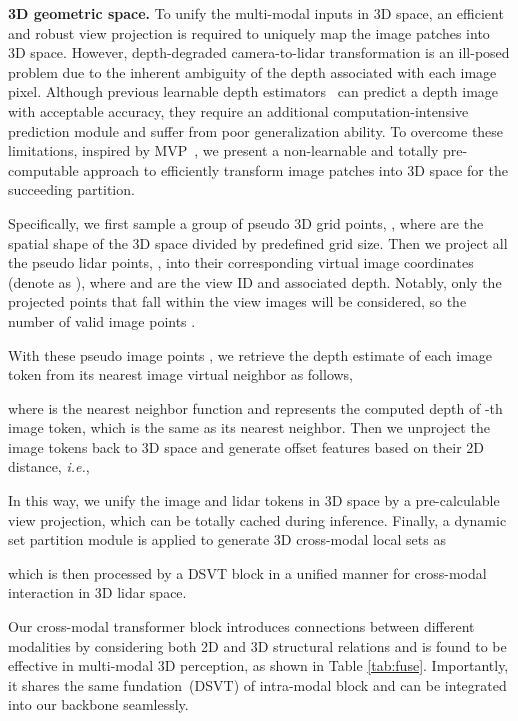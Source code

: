 \documentclass[10pt,twocolumn,letterpaper]{article}
\begin{document}
\noindent \textbf{3D geometric space.} To unify the multi-modal inputs in 3D space, an efficient and robust view projection is required to uniquely map the image patches into 3D space. However, depth-degraded camera-to-lidar transformation is an ill-posed problem due to the inherent ambiguity of the depth associated with each image pixel. Although previous learnable depth estimators~\cite{godard2017unsupervised,fu2018deep} can predict a depth image with acceptable accuracy, they require an additional computation-intensive prediction module and suffer from poor generalization ability. To overcome these limitations, inspired by MVP~\cite{yin2021multimodal}, we present a non-learnable and totally pre-computable approach to efficiently transform image patches into 3D space for the succeeding partition. 

Specifically, we first sample a group of pseudo 3D grid points, , where  are the spatial shape of the 3D space divided by predefined grid size. Then we project all the pseudo lidar points, , into their corresponding virtual image coordinates (denote as ), where  and  are the view ID and associated depth. Notably, only the projected points that fall within the view images will be considered, so the number of valid image points .

With these pseudo image points , we retrieve the depth estimate of each image token from its nearest image virtual neighbor as follows,
\vspace{-2pt}

where  is the nearest neighbor function and  represents the computed depth of -th image token, which is the same as its nearest neighbor. Then we unproject the image tokens  back to 3D space and generate offset features based on their 2D distance, \emph{i.e.}, 
\vspace{-2pt}

In this way, we unify the image and lidar tokens in 3D space by a pre-calculable view projection, which can be totally cached during inference. Finally, a dynamic set partition module is applied to generate 3D cross-modal local sets as 
\vspace{-2pt}

which is then processed by a DSVT block in a unified manner for cross-modal interaction in 3D lidar space.

Our cross-modal transformer block introduces connections between different modalities by considering both 2D and 3D structural relations and is found to be effective in multi-modal 3D perception, as shown in Table \ref{tab:fuse}. Importantly, it shares the same fundation~(DSVT) of intra-modal block and can be integrated into our backbone seamlessly.
\end{document}

